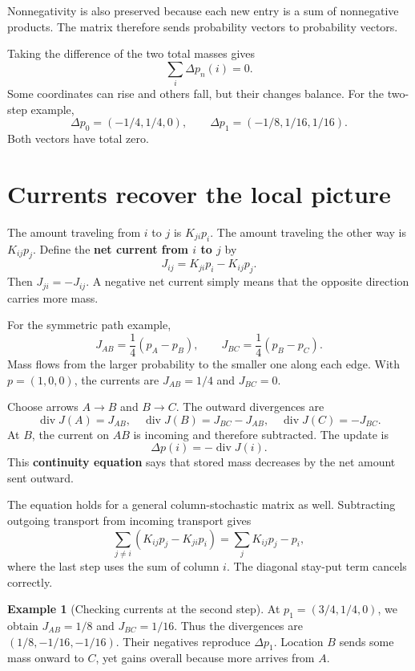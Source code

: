 \documentclass[11pt,oneside,openany]{book}
\theoremstyle{definition}
\newtheorem{example}{Example}[chapter]
\theoremstyle{remark}
\numberwithin{equation}{chapter}
\begin{document}
Nonnegativity is also preserved because each new entry is a sum of nonnegative products. The matrix therefore sends probability vectors to probability vectors.

Taking the difference of the two total masses gives \[\sum_i\Delta p_n(i)=0.\] Some coordinates can rise and others fall, but their changes balance. For the two-step example, \[\Delta p_0=(-1/4,1/4,0),\qquad
\Delta p_1=(-1/8,1/16,1/16).\] Both vectors have total zero.

\section{Currents recover the local picture}\label{ch04-currents-recover-the-local-picture}

The amount traveling from \(i\) to \(j\) is \(K_{ji}p_i\). The amount traveling the other way is \(K_{ij}p_j\). Define the \textbf{net current from \(i\) to \(j\)} by \[J_{ij}=K_{ji}p_i-K_{ij}p_j.\] Then \(J_{ji}=-J_{ij}\). A negative net current simply means that the opposite direction carries more mass.

For the symmetric path example, \[J_{AB}=\frac14(p_A-p_B),\qquad
J_{BC}=\frac14(p_B-p_C).\] Mass flows from the larger probability to the smaller one along each edge. With \(p=(1,0,0)\), the currents are \(J_{AB}=1/4\) and \(J_{BC}=0\).

Choose arrows \(A\to B\) and \(B\to C\). The outward divergences are \[\operatorname{div}J(A)=J_{AB},\quad
\operatorname{div}J(B)=J_{BC}-J_{AB},\quad
\operatorname{div}J(C)=-J_{BC}.\] At \(B\), the current on \(AB\) is incoming and therefore subtracted. The update is \[\boxed{\Delta p(i)=-\operatorname{div}J(i).}\] This \textbf{continuity equation} says that stored mass decreases by the net amount sent outward.

The equation holds for a general column-stochastic matrix as well. Subtracting outgoing transport from incoming transport gives \[\sum_{j\ne i}(K_{ij}p_j-K_{ji}p_i)
=\sum_jK_{ij}p_j-p_i,\] where the last step uses the sum of column \(i\). The diagonal stay-put term cancels correctly.

\begin{example}[Checking currents at the second step]

At \(p_1=(3/4,1/4,0)\), we obtain \(J_{AB}=1/8\) and \(J_{BC}=1/16\). Thus the divergences are \((1/8,-1/16,-1/16)\). Their negatives reproduce \(\Delta p_1\). Location \(B\) sends some mass onward to \(C\), yet gains overall because more arrives from \(A\).

\end{example}
\end{document}
